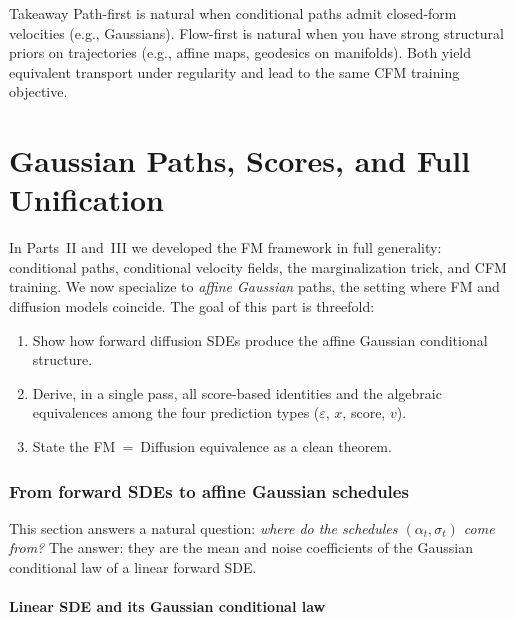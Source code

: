 \documentclass[11pt]{article}
\theoremstyle{definition}
\theoremstyle{remark}
\begin{document}
\begin{warnbox}{Takeaway}
Path-first is natural when conditional paths admit closed-form velocities (e.g., Gaussians).
Flow-first is natural when you have strong structural priors on trajectories (e.g., affine maps, geodesics on manifolds).
Both yield equivalent transport under regularity and lead to the same CFM training objective.
\end{warnbox}

\newpage

\part{Gaussian Paths, Scores, and Full Unification}

In Parts~II and~III we developed the FM framework in full generality: conditional paths, conditional velocity fields, the marginalization trick, and CFM training.
We now specialize to \emph{affine Gaussian} paths, the setting where FM and diffusion models coincide.
The goal of this part is threefold:
\begin{enumerate}[nosep]
\item Show how forward diffusion SDEs produce the affine Gaussian conditional structure.
\item Derive, in a single pass, all score-based identities and the algebraic equivalences among the four prediction types ($\varepsilon$, $x$, score, $v$).
\item State the FM~=~Diffusion equivalence as a clean theorem.
\end{enumerate}

\section{From forward SDEs to affine Gaussian schedules}\label{sec:linear-sde}

This section answers a natural question: \emph{where do the schedules $(\alpha_t,\sigma_t)$ come from?}
The answer: they are the mean and noise coefficients of the Gaussian conditional law of a linear forward SDE.

\subsection{Linear SDE and its Gaussian conditional law}
\end{document}

